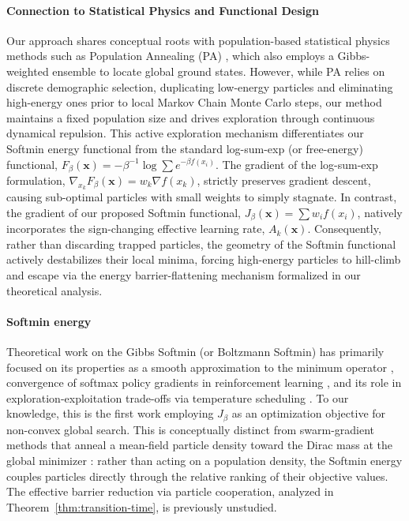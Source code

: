 \documentclass{opt2026} %
\newcommand{\prefactor}[2]{A_{#1}(#2)}
\newcommand{\xx}{\mathbf{x}}
\begin{document}
\paragraph{Connection to Statistical Physics and Functional Design}
Our approach shares conceptual roots with population-based statistical physics methods such as Population Annealing (PA) \citep{Wang_2015}, which also employs a Gibbs-weighted ensemble to locate global ground states. However, while PA relies on discrete demographic selection, duplicating low-energy particles and eliminating high-energy ones prior to local Markov Chain Monte Carlo steps, our method maintains a fixed population size and drives exploration through continuous dynamical repulsion. This active exploration mechanism differentiates our Softmin energy functional from the standard log-sum-exp (or free-energy) functional, $F_\beta(\xx) = -{\beta}^{-1} \log \sum e^{-\beta f(x_i)}$. The gradient of the log-sum-exp formulation, $\nabla_{x_k} F_\beta(\xx) = w_k \nabla f(x_k)$, strictly preserves gradient descent, causing sub-optimal particles with small weights to simply stagnate. In contrast, the gradient of our proposed Softmin functional, $J_\beta(\xx) = \sum w_i f(x_i)$, natively incorporates the sign-changing effective learning rate, $\prefactor{k}{\xx}$. Consequently, rather than discarding trapped particles, the geometry of the Softmin functional actively destabilizes their local minima, forcing high-energy particles to hill-climb and escape via the energy barrier-flattening mechanism formalized in our theoretical analysis.

\paragraph{Softmin energy} Theoretical work on the Gibbs Softmin (or Boltzmann Softmin) has primarily focused on its properties as a smooth approximation to the minimum operator \citep{bertsekas1999nonlinear}, convergence of softmax policy gradients in reinforcement learning \citep{mei2020global}, and its role in exploration-exploitation trade-offs via temperature scheduling \citep{song2019revisiting}. To our knowledge, this is the first work employing $J_\beta$ as an optimization objective for non-convex global search. This is conceptually distinct from swarm-gradient methods that anneal a mean-field particle density toward the Dirac mass at the global minimizer \citep{bolte2024swarm}: rather than acting on a population density, the Softmin energy couples particles directly through the relative ranking of their objective values. The effective barrier reduction via particle cooperation, analyzed in Theorem~\ref{thm:transition-time}, is previously unstudied.
\end{document}
